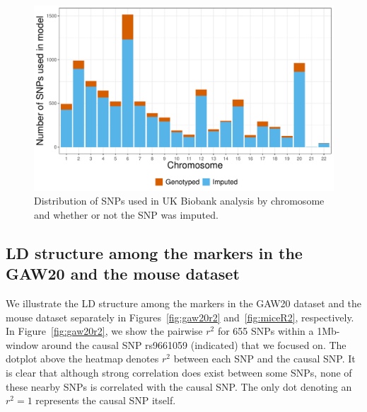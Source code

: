 \documentclass[12pt,letter]{article}\usepackage[]{graphicx}\usepackage[]{color}
\newenvironment{knitrout}{}{} %
\begin{document}
\begin{knitrout}\scriptsize
{}\color{fgcolor}\begin{figure}[H]

{\centering \includegraphics[width=1\linewidth]{figure/UKB-chromosome-distribution-1} 

}

\caption[Distribution of SNPs used in UK Biobank analysis by chromosome and whether or not the SNP was imputed]{Distribution of SNPs used in UK Biobank analysis by chromosome and whether or not the SNP was imputed.}\label{fig:UKB-chromosome-distribution}
\end{figure}


\end{knitrout}


\newpage

\subsection{LD structure among the markers in the GAW20 and the mouse dataset}\label{ap:ldplots}


We illustrate the LD structure among the markers in the GAW20 dataset and the mouse dataset separately in Figures~\ref{fig:gaw20r2} and~\ref{fig:miceR2}, respectively. In Figure~\ref{fig:gaw20r2}, we show the pairwise $r^2$ for 655 SNPs within a 1Mb-window around the causal SNP rs9661059 (indicated) that we focused on. The dotplot above the heatmap denotes $r^2$ between each SNP and the causal SNP. It is clear that although strong correlation does exist between some SNPs, none of these nearby SNPs is correlated with the causal SNP. The only dot denoting an $r^2=1$ represents the causal SNP itself.
\end{document}
